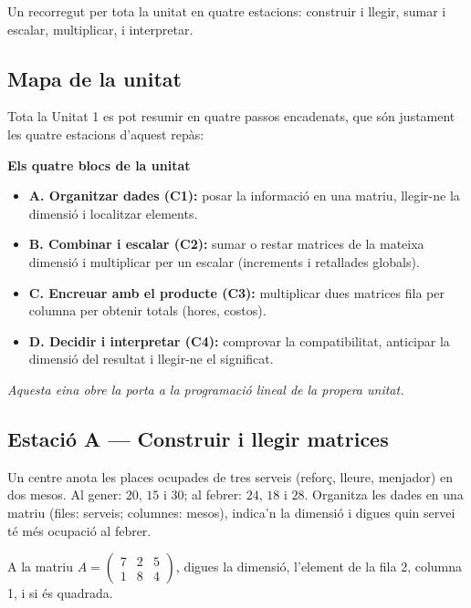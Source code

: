 %
{Un recorregut per tota la unitat en quatre estacions: construir i llegir, sumar i escalar, multiplicar, i interpretar.}

\subsection{Mapa de la unitat}

Tota la Unitat 1 es pot resumir en quatre passos encadenats, que són justament les
quatre estacions d'aquest repàs:

\begin{idea}
\textbf{Els quatre blocs de la unitat}
\begin{itemize}[leftmargin=1.4em, itemsep=2pt]
  \item \textbf{A. Organitzar dades (C1):} posar la informació en una matriu,
        llegir-ne la dimensió i localitzar elements.
  \item \textbf{B. Combinar i escalar (C2):} sumar o restar matrices de la mateixa
        dimensió i multiplicar per un escalar (increments i retallades globals).
  \item \textbf{C. Encreuar amb el producte (C3):} multiplicar dues matrices fila
        per columna per obtenir totals (hores, costos).
  \item \textbf{D. Decidir i interpretar (C4):} comprovar la compatibilitat,
        anticipar la dimensió del resultat i llegir-ne el significat.
\end{itemize}
\textit{Aquesta eina obre la porta a la programació lineal de la propera unitat.}
\end{idea}

\subsection{Estació A — Construir i llegir matrices}

\begin{exercicis}[Estació A]
\begin{exlist}
  \item Un centre anota les places ocupades de tres serveis (reforç, lleure,
        menjador) en dos mesos. Al gener: $20$, $15$ i $30$; al febrer: $24$, $18$
        i $28$. Organitza les dades en una matriu (files: serveis; columnes: mesos),
        indica'n la dimensió i digues quin servei té més ocupació al febrer.
  \item A la matriu $A=\begin{pmatrix} 7 & 2 & 5 \\ 1 & 8 & 4 \end{pmatrix}$,
        digues la dimensió, l'element de la fila 2, columna 1, i si és quadrada.
\end{exlist}
\end{exercicis}

